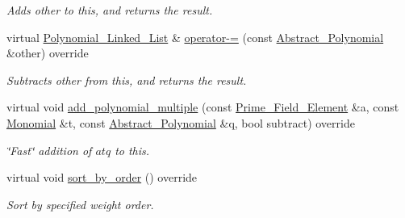 \begin{Indent}
\begin{DoxyCompactItemize}
\begin{DoxyCompactList}\small\item\em Adds {\ttfamily other} to {\ttfamily this}, and returns the result. \end{DoxyCompactList}\item 
\mbox{\label{group__polygroup_a80f13f9bdcabb034c83c243fd0bdc004}} 
virtual \hyperlink{group__polygroup_class_polynomial___linked___list}{Polynomial\+\_\+\+Linked\+\_\+\+List} \& \hyperlink{group__polygroup_a80f13f9bdcabb034c83c243fd0bdc004}{operator-\/=} (const \hyperlink{group__polygroup_class_abstract___polynomial}{Abstract\+\_\+\+Polynomial} \&other) override
\begin{DoxyCompactList}\small\item\em Subtracts {\ttfamily other} from {\ttfamily this}, and returns the result. \end{DoxyCompactList}\item 
virtual void \hyperlink{group__polygroup_a610a577011774265552efb30508ece94}{add\+\_\+polynomial\+\_\+multiple} (const \hyperlink{group___fields_group_class_prime___field___element}{Prime\+\_\+\+Field\+\_\+\+Element} \&a, const \hyperlink{group__polygroup_class_monomial}{Monomial} \&t, const \hyperlink{group__polygroup_class_abstract___polynomial}{Abstract\+\_\+\+Polynomial} \&q, bool subtract) override
\begin{DoxyCompactList}\small\item\em \char`\"{}\+Fast\char`\"{} addition of $atq$ to {\ttfamily this}. \end{DoxyCompactList}\item 
\mbox{\label{group__polygroup_a254bec60707b34bd26ef9d9bb08a4fe9}} 
virtual void \hyperlink{group__polygroup_a254bec60707b34bd26ef9d9bb08a4fe9}{sort\+\_\+by\+\_\+order} () override
\begin{DoxyCompactList}\small\item\em Sort by specified weight order. \end{DoxyCompactList}\end{DoxyCompactItemize}
\end{Indent}
